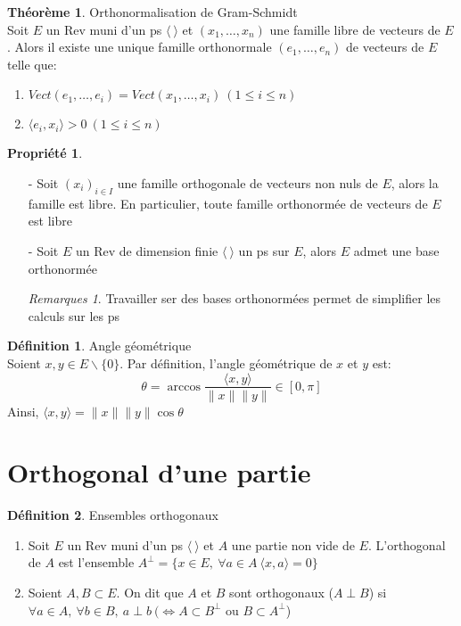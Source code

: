 \documentclass[fleqn]{article}
\theoremstyle{definition} \newtheorem*{defi}{D\'efinition}
\theoremstyle{definition} \newtheorem*{theo}{Th\'eor\`eme}
\theoremstyle{definition} \newtheorem*{coro}{Corollaire}
\theoremstyle{remark} \newtheorem*{rqs}{Remarques}
\theoremstyle{definition} \newtheorem*{prop}{Propri\'et\'e}
\begin{document}
\begin{theo} Orthonormalisation de Gram-Schmidt \\
	Soit $E$ un Rev muni d'un ps $\langle\ \rangle$ et $(x_1, \hdots, x_n)$ une famille libre de vecteurs de $E$. Alors il existe une unique
	famille orthonormale $(e_1, \hdots, e_n)$ de vecteurs de $E$ telle que:
	\begin{enumerate}
		\item $Vect(e_1, \hdots, e_i) = Vect(x_1, \hdots, x_i)\ (1 \leq i \leq n)$
		\item $\langle e_i,x_i \rangle > 0\ (1 \leq i \leq n)$
	\end{enumerate}
\end{theo}

\begin{prop} $ $
	\begin{enumerate}
		\item [-] Soit $(x_i)_{i\in I}$ une famille orthogonale de vecteurs non nuls de $E$, alors la famille est libre. En particulier, toute
			famille orthonorm\'ee de vecteurs de $E$ est libre
		\item [-] Soit $E$ un Rev de dimension finie  $\langle\ \rangle$ un ps sur $E$, alors $E$ admet une base orthonorm\'ee
			\begin{rqs} Travailler ser des bases orthonorm\'ees permet de simplifier les calculs sur les ps \end{rqs}
	\end{enumerate}
\end{prop}

\begin{defi} Angle g\'eom\'etrique \\
	Soient $x,y \in E\backslash \{0\}$. Par d\'efinition, l'angle g\'eom\'etrique de $x$ et $y$ est:
	\[\theta = \arccos \frac{\langle x,y \rangle}{\|x\| \|y\|} \in [0, \pi]\]
	Ainsi, $\langle x,y \rangle = \|x\| \|y\| \cos \theta$
\end{defi}

\section{Orthogonal d'une partie}
\begin{defi} Ensembles orthogonaux
	\begin{enumerate}
		\item Soit $E$ un Rev muni d'un ps $\langle\ \rangle$ et $A$ une partie non vide de $E$. L'orthogonal de $A$ est l'ensemble $A^{\perp} =
			\{x \in E,\ \forall a \in A\ \langle x,a \rangle = 0\}$
		\item Soient $A,B \subset E$. On dit que $A$ et $B$ sont orthogonaux ($A \perp B$) si $\forall a \in A,\ \forall b \in B,\ a \perp b
			\ (\Leftrightarrow A \subset B^\perp$ ou $B \subset A^\perp$)
	\end{enumerate}
\end{defi}
\end{document}

